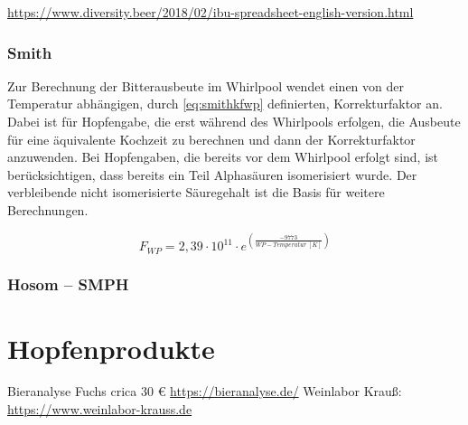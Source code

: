 \documentclass[a4paper,parskip=half]{scrartcl}
\begin{document}
\url{https://www.diversity.beer/2018/02/ibu-spreadsheet-english-version.html}
\parencite{Novotny2016}
\parencite{Novotny2018}

\subsubsection*{Smith}

Zur Berechnung der Bitterausbeute im Whirlpool wendet \citeauthor{Smith2019}
einen von der Temperatur abhängigen, durch \autoref{eq:smithkfwp} definierten,
Korrekturfaktor an. Dabei ist für Hopfengabe, die erst während des Whirlpools
erfolgen, die Ausbeute für eine äquivalente Kochzeit zu berechnen und dann der
Korrekturfaktor anzuwenden. Bei Hopfengaben, die bereits vor dem Whirlpool erfolgt
sind, ist berücksichtigen, dass bereits ein Teil Alphasäuren isomerisiert wurde.
Der verbleibende nicht isomerisierte Säuregehalt ist die Basis für weitere
Berechnungen. \parencite{Smith2019}

\begin{equation}
\mathit{F}_{\mathit{WP}} = 2,39 \cdot 10^{11} \cdot e^{\left(\frac{-9773}{\mathit{WP-Temperatur}\:[K]} \right)}
\label{eq:smithkfwp}
\end{equation}

\subsubsection*{Hosom – SMPH}

\parencite{Hosom2021}

\section*{Hopfenprodukte}


\parencite{Janish2019}
\parencite{Hieronymus2012}
\parencite{Nottebohm2020}
\parencite{Hall1997}
\parencite{Pyle1995}
\parencite{Justus2018}
\parencite{Parkin2017}
\parencite{Bishop1964}
\parencite{Nickerson1979}
\parencite{Calado2019}

\parencite{Bruecklmeier2017}
\parencite{Bruecklmeier2018}

Bieranalyse Fuchs crica 30 € \url{https://bieranalyse.de/}
Weinlabor Krauß: \url{https://www.weinlabor-krauss.de}

\printbibliography[title=Quellen]
\end{document}
